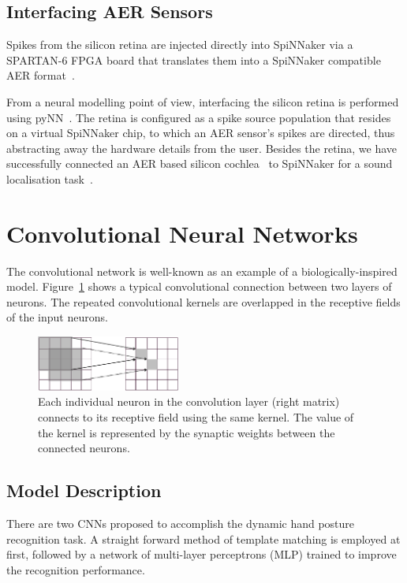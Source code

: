 \documentclass[journal]{journal}
\begin{document}
\subsection{Interfacing AER Sensors}
Spikes from the silicon retina are injected directly into SpiNNaker via a SPARTAN-6 FPGA board that translates them into a SpiNNaker compatible AER format~\cite{appnote8}. 

From a neural modelling point of view, interfacing the silicon retina is performed using pyNN~\cite{davison2008pynn}. 
The retina is configured as a spike source population that resides on a virtual SpiNNaker chip, to which an AER sensor's spikes are directed, thus abstracting away the hardware details from the user\cite{galluppi2012real}.
Besides the retina, we have successfully connected an AER based silicon cochlea~\cite{5537164} to SpiNNaker for a sound localisation task~\cite{6706931}.

\section{Convolutional Neural Networks}
\label{sec:cnn}
The convolutional network is well-known as an example of a biologically-inspired model. 
Figure~\ref{fig:conv} shows a typical convolutional connection between two layers of neurons. 
The repeated convolutional kernels are overlapped in the receptive fields of the input neurons. 
\begin{figure}
\centering
	\includegraphics[width=0.42\textwidth]{pics/conv.pdf}
	\caption{Each individual neuron in the convolution layer (right matrix) connects to its receptive field using the same kernel. The value of the kernel is represented by the synaptic weights between the connected neurons.}
	\label{fig:conv}
\end{figure}

\subsection{Model Description}
\label{sec:mds}
There are two CNNs proposed to accomplish the dynamic hand posture recognition task.
A straight forward method of template matching is employed at first, followed by a network of multi-layer perceptrons (MLP) trained to improve the recognition performance.
\end{document}
